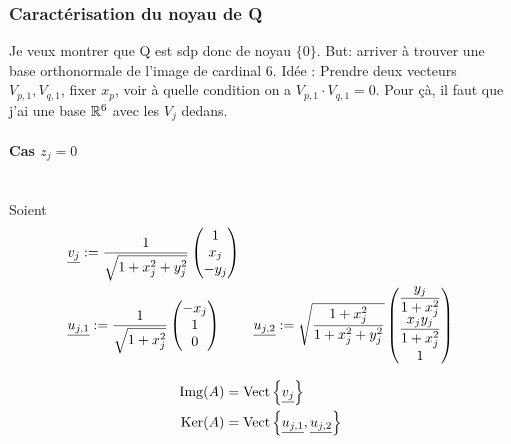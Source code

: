\subsubsection{Caractérisation du noyau de Q}

{
\color{blue}
Je veux montrer que Q est sdp donc de noyau $\lbrace0\rbrace$. But: arriver à trouver une base orthonormale de l'image de cardinal 6. Idée : Prendre deux vecteurs $V_{p,1}, V_{q,1}$, fixer $x_p$, voir à quelle condition on a $V_{p,1} \cdot V_{q,1} = 0$. Pour çà, il faut que j'ai une base $\mathbb R^6$ avec les $V_j$ dedans.
}


\paragraph{Cas $z_j=0$}\label{sec_Qj_z0}~{}\\

Soient
\begin{align*}
 &\underline{v_j} := \dfrac{1}{\sqrt{1 + x_j^2 + y_j^2}}
  \begin{pmatrix}
  1 \\
  x_j \\
  -y_j
  \end{pmatrix} & \\
&\underline{u_{j,1}} := \dfrac{1}{\sqrt{1+x_j^2}}
  \begin{pmatrix}
  -x_j \\
  1 \\
  0 \end{pmatrix} &
\underline{u_{j,2}} := \sqrt{\dfrac{1+x_j^2}{1+x_j^2+y_j^2}}
  \begin{pmatrix}
  \dfrac{y_j}{1+x_j^2}\\
  \dfrac{x_j y_j}{1+x_j^2}\\
  1
  \end{pmatrix}
\end{align*}

\begin{prop}
  \begin{align*}
    \operatorname{Img}(A) &= \operatorname{Vect}\left\lbrace\underline{v_j}\right\rbrace\\
    \operatorname{Ker}(A) &= \operatorname{Vect}\left\lbrace\underline{u_{j,1}},\underline{u_{j,2}}\right\rbrace
  \end{align*}
\end{prop}

